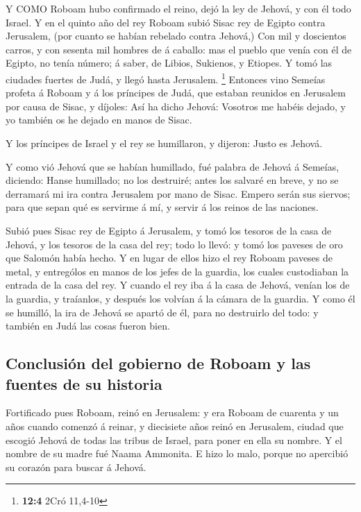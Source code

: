  Y COMO Roboam hubo confirmado el reino, dejó la ley de
Jehová, y con él todo Israel.  Y en el quinto año del rey
Roboam subió Sisac rey de Egipto contra Jerusalem, (por cuanto se habían
rebelado contra Jehová,)  Con mil y doscientos carros, y con
sesenta mil hombres de á caballo: mas el pueblo que venía con él de
Egipto, no tenía número; á saber, de Libios, Sukienos, y Etiopes.
 Y tomó las ciudades fuertes de Judá, y llegó hasta
Jerusalem. \footnote{\textbf{12:4} 2Cró 11,4-10}  Entonces
vino Semeías profeta á Roboam y á los príncipes de Judá, que estaban
reunidos en Jerusalem por causa de Sisac, y díjoles: Así ha dicho
Jehová: Vosotros me habéis dejado, y yo también os he dejado en manos de
Sisac.

 Y los príncipes de Israel y el rey se humillaron, y
dijeron: Justo es Jehová.

 Y como vió Jehová que se habían humillado, fué palabra de
Jehová á Semeías, diciendo: Hanse humillado; no los destruiré; antes los
salvaré en breve, y no se derramará mi ira contra Jerusalem por mano de
Sisac.  Empero serán sus siervos; para que sepan qué es
servirme á mí, y servir á los reinos de las naciones.

 Subió pues Sisac rey de Egipto á Jerusalem, y tomó los
tesoros de la casa de Jehová, y los tesoros de la casa del rey; todo lo
llevó: y tomó los paveses de oro que Salomón había hecho. 
Y en lugar de ellos hizo el rey Roboam paveses de metal, y entrególos en
manos de los jefes de la guardia, los cuales custodiaban la entrada de
la casa del rey.  Y cuando el rey iba á la casa de Jehová,
venían los de la guardia, y traíanlos, y después los volvían á la cámara
de la guardia.  Y como él se humilló, la ira de Jehová se
apartó de él, para no destruirlo del todo: y también en Judá las cosas
fueron bien.

\hypertarget{conclusiuxf3n-del-gobierno-de-roboam-y-las-fuentes-de-su-historia}{%
\subsection{Conclusión del gobierno de Roboam y las fuentes de su
historia}\label{conclusiuxf3n-del-gobierno-de-roboam-y-las-fuentes-de-su-historia}}

 Fortificado pues Roboam, reinó en Jerusalem: y era Roboam
de cuarenta y un años cuando comenzó á reinar, y diecisiete años reinó
en Jerusalem, ciudad que escogió Jehová de todas las tribus de Israel,
para poner en ella su nombre. Y el nombre de su madre fué Naama
Ammonita.  E hizo lo malo, porque no apercibió su corazón
para buscar á Jehová.

